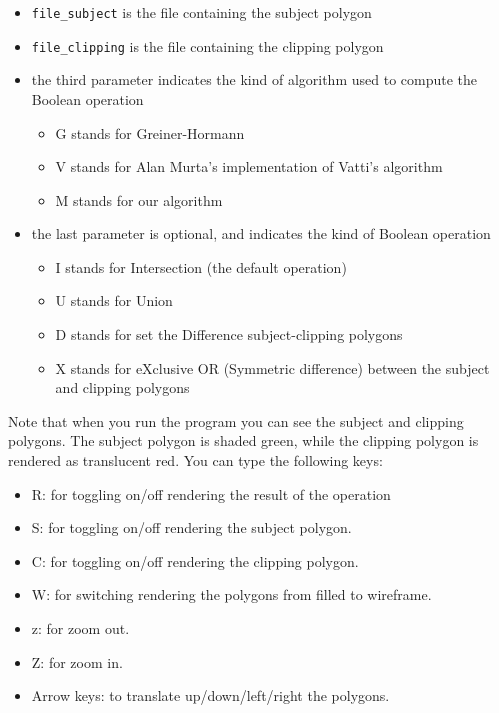 \documentclass[a4paper]{article}
\begin{document}
\begin{itemize}
 \item \verb+file_subject+ is the file containing the subject polygon
 \item \verb+file_clipping+ is the file containing the clipping polygon
 \item the third parameter indicates the kind of algorithm used to compute the Boolean operation
   \begin{itemize}
     \item G stands for Greiner-Hormann
     \item V stands for Alan Murta's implementation of Vatti's algorithm
     \item M stands for our algorithm
   \end{itemize}
 \item the last parameter is optional, and indicates the kind of Boolean operation
   \begin{itemize}
     \item I stands for Intersection (the default operation)
     \item U stands for Union
     \item D stands for set the Difference subject-clipping polygons
    \item X stands for eXclusive OR (Symmetric difference) between the subject and clipping polygons
   \end{itemize}
\end{itemize}

Note that when you run the program you can see the subject and clipping polygons. The subject polygon is shaded green, while the clipping
polygon is rendered as translucent red. You can type the following keys:

\begin{itemize}
 \item R: for toggling on/off rendering the result of the operation
 \item S: for toggling on/off rendering the subject polygon.
 \item C: for toggling on/off rendering the clipping polygon.
 \item W: for switching rendering the polygons from filled to wireframe.
 \item z: for zoom out.
 \item Z: for zoom in.
 \item Arrow keys: to translate up/down/left/right the polygons.
\end{itemize}
\end{document}
